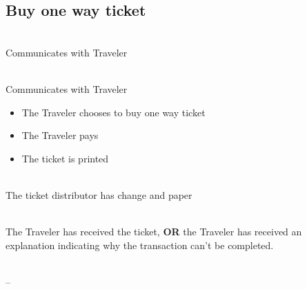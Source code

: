 \subsection{Buy one way ticket}


 \\
Communicates with Traveler
\\

 \\
Communicates with Traveler
\\
\begin{itemize}

\item The Traveler chooses to buy one way ticket
\item The Traveler pays
\item The ticket is printed

\end{itemize}

 \\
The ticket distributor has change and paper
\\

 \\
The Traveler has received the ticket, \textbf{OR} the Traveler has received an explanation indicating why the transaction can't be completed.
\\

 \\
--
\\
